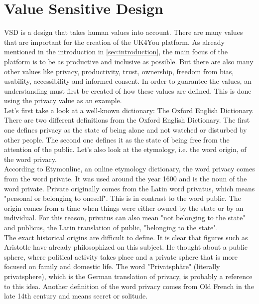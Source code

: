 \section{Value Sensitive Design}\label{sec:vsd}
VSD is a design that takes human values into account\cite{friedman-vsd}.
There are many values that are important for the creation of the UK4You platform.
As already mentioned in the introduction in \autoref{sec:introduction}, the main focus of the platform is to be as productive and inclusive as possible.
But there are also many other values like privacy, productivity, trust, ownership, freedom from bias, usability, accessibility and informed consent.
In order to guarantee the values, an understanding must first be created of how these values are defined.
This is done using the privacy value as an example.\\

Let's first take a look at a well-known dictionary: The Oxford English Dictionary.
There are two different definitions from the Oxford English Dictionary\cite{oxford-dictionary}.
The first one defines privacy as the state of being alone and not watched or disturbed by other people.
The second one defines it as the state of being free from the attention of the public.
Let's also look at the etymology, i.e. the word origin, of the word privacy.\\

According to Etymonline, an online etymology dictionary, the word privacy comes from the word private\cite{etymonline}.
It was used around the year 1600 and is the noun of the word private.
Private originally comes from the Latin word privatus, which means "personal or belonging to oneself". %
This is in contrast to the word public.
The origin comes from a time when things were either owned by the state or by an individual.
For this reason, privatus can also mean "not belonging to the state" and publicus, the Latin translation of public, "belonging to the state". \\ %

The exact historical origins are difficult to define.
It is clear that figures such as Aristotle have already philosophized on this subject\cite{stanford-philosophy}.
He thought about a public sphere, where political activity takes place and a private sphere that is more focused on family and domestic life.
The word "Privatsphäre" (literally privatsphere), which is the German translation of privacy, is probably a reference to this idea.
Another definition of the word privacy comes from Old French in the late 14th century and means secret or solitude.\\

